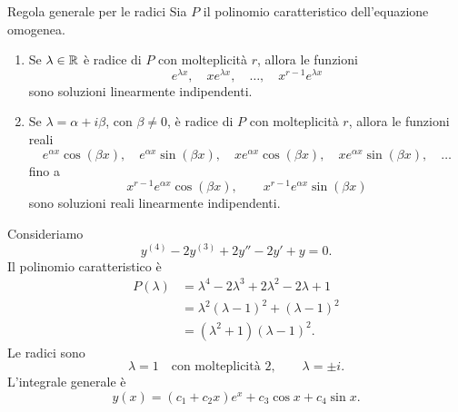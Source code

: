 \documentclass[a4paper]{article}
\begin{document}
\begin{radioactive}
\begin{snippettheorem}{Regola generale per le radici}
    Sia \(P\) il polinomio caratteristico dell'equazione omogenea.

    \begin{enumerate}
        \item Se \(\lambda\in\mathbb{R}\) è radice di \(P\) con molteplicità \(r\), allora le funzioni
            \[
                e^{\lambda x},
                \quad
                xe^{\lambda x},
                \quad
                \ldots,
                \quad
                x^{r-1}e^{\lambda x}
            \]
            sono soluzioni linearmente indipendenti.

        \item Se \(\lambda=\alpha+i\beta\), con \(\beta\neq 0\), è radice di \(P\) con molteplicità \(r\), allora le funzioni reali
            \[
                e^{\alpha x}\cos(\beta x),
                \quad
                e^{\alpha x}\sin(\beta x),
                \quad
                xe^{\alpha x}\cos(\beta x),
                \quad
                xe^{\alpha x}\sin(\beta x),
                \quad
                \ldots
            \]
            fino a
            \[
                x^{r-1}e^{\alpha x}\cos(\beta x),
                \qquad
                x^{r-1}e^{\alpha x}\sin(\beta x)
            \]
            sono soluzioni reali linearmente indipendenti.
    \end{enumerate}
\end{snippettheorem}
\end{radioactive}

\begin{radioactive}
\begin{snippetexample}{}
    Consideriamo
    \[
        y^{(4)}-2y^{(3)}+2y''-2y'+y=0.
    \]
    Il polinomio caratteristico è
    \begin{align*}
        P(\lambda)
        &=
        \lambda^4-2\lambda^3+2\lambda^2-2\lambda+1\\
        &=
        \lambda^2(\lambda-1)^2+(\lambda-1)^2\\
        &=
        (\lambda^2+1)(\lambda-1)^2.
    \end{align*}
    Le radici sono
    \[
        \lambda=1
        \quad\text{con molteplicità }2,
        \qquad
        \lambda=\pm i.
    \]
    L'integrale generale è
    \[
        y(x)=(c_1+c_2x)e^x+c_3\cos x+c_4\sin x.
    \]
\end{snippetexample}
\end{radioactive}
\end{document}
